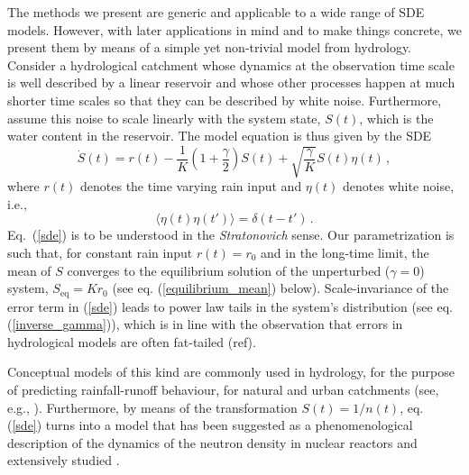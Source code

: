 \documentclass[12pt,a4paper,final]{iopart}
\newcommand{\eq}{\mbox{eq}}
\begin{document}
The methods we present are generic and applicable to a wide range of SDE models.
However, with later applications in mind and to make things concrete, we present them by means of a simple yet non-trivial model from hydrology.
Consider a hydrological catchment whose dynamics at the observation time scale is well described by a linear reservoir and whose other processes happen at much shorter time scales so that they can be described by white noise.
Furthermore, assume this noise to scale linearly with the system state, $S(t)$, which is the water content in the reservoir.
The model equation is thus given by the SDE
\begin{equation}\label{sde}
\dot{S}(t) = r(t) - \frac{1}{K}\left(1+\frac{\gamma}{2}\right) S(t)
+
\sqrt{\frac{\gamma}{K}} S(t){\eta}(t)\,,
\end{equation}
where $r(t)$ denotes the time varying rain input and $\eta(t)$ denotes white noise, i.e.,
\begin{equation}\label{whitenoise}
\langle\eta(t)\eta(t')\rangle = \delta(t-t')\,.
\end{equation}
Eq.~(\ref{sde}) is to be understood in the {\em Stratonovich} sense.
Our parametrization is such that, for constant rain input $r(t)=r_0$ and in the long-time limit, the mean of $S$ converges to the equilibrium solution of the unperturbed ($\gamma=0$) system, $S_{\eq}=Kr_0$ (see eq. (\ref{equilibrium_mean}) below).
Scale-invariance of the error term in (\ref{sde}) leads to power law tails in the system's distribution (see eq. (\ref{inverse_gamma})), which is in line with the observation that errors in hydrological models are often fat-tailed (ref).

Conceptual models of this kind are commonly used in hydrology, for the purpose of predicting rainfall-runoff behaviour, for natural and urban catchments (see, e.g., \cite{breinholt_2011_SDE}).
Furthermore, by means of the transformation $S(t)=1/n(t)$, eq. (\ref{sde}) turns into a model that has been suggested as a phenomenological description of the dynamics of the neutron density in nuclear reactors and extensively studied \cite{dutre_1977_SDE, fujisaka_1986_intermittency}.
\end{document}

